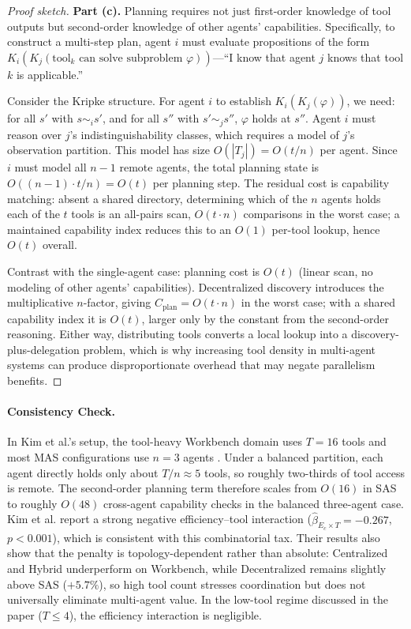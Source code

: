 \begin{proof}[Proof sketch]
\textbf{Part (c).} Planning requires not just first-order knowledge of tool outputs but second-order knowledge of other agents' capabilities. Specifically, to construct a multi-step plan, agent $i$ must evaluate propositions of the form $K_i(K_j(\mathrm{tool}_k \text{ can solve subproblem } \varphi))$---``I know that agent $j$ knows that tool $k$ is applicable.''

Consider the Kripke structure. For agent $i$ to establish $K_i(K_j(\varphi))$, we need: for all $s'$ with $s \sim_i s'$, and for all $s''$ with $s' \sim_j s''$, $\varphi$ holds at $s''$. Agent $i$ must reason over $j$'s indistinguishability classes, which requires a model of $j$'s observation partition. This model has size $O(|T_j|) = O(t/n)$ per agent. Since $i$ must model all $n-1$ remote agents, the total planning state is $O((n-1) \cdot t/n) = O(t)$ per planning step. The residual cost is capability matching: absent a shared directory, determining which of the $n$ agents holds each of the $t$ tools is an all-pairs scan, $O(t \cdot n)$ comparisons in the worst case; a maintained capability index reduces this to an $O(1)$ per-tool lookup, hence $O(t)$ overall.

Contrast with the single-agent case: planning cost is $O(t)$ (linear scan, no modeling of other agents' capabilities). Decentralized discovery introduces the multiplicative $n$-factor, giving $C_{\mathrm{plan}} = O(t \cdot n)$ in the worst case; with a shared capability index it is $O(t)$, larger only by the constant from the second-order reasoning. Either way, distributing tools converts a local lookup into a discovery-plus-delegation problem, which is why increasing tool density in multi-agent systems can produce disproportionate overhead that may negate parallelism benefits.
\end{proof}

\paragraph{Consistency Check.} In Kim et al.'s setup, the tool-heavy Workbench domain uses $T = 16$ tools and most MAS configurations use $n = 3$ agents \cite{kim2025scaling}. Under a balanced partition, each agent directly holds only about $T/n \approx 5$ tools, so roughly two-thirds of tool access is remote. The second-order planning term therefore scales from $O(16)$ in SAS to roughly $O(48)$ cross-agent capability checks in the balanced three-agent case. Kim et al. report a strong negative efficiency--tool interaction ($\hat{\beta}_{E_c \times T} = -0.267$, $p < 0.001$), which is consistent with this combinatorial tax. Their results also show that the penalty is topology-dependent rather than absolute: Centralized and Hybrid underperform on Workbench, while Decentralized remains slightly above SAS ($+5.7\%$), so high tool count stresses coordination but does not universally eliminate multi-agent value. In the low-tool regime discussed in the paper ($T \le 4$), the efficiency interaction is negligible.

